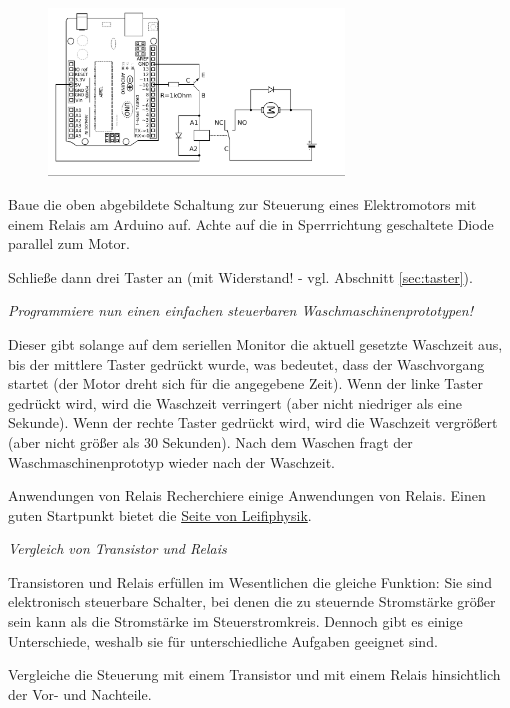 \begin{projekt}[Waschmaschinensteuerung]\label{proj:waschmaschinensteuerung}
	\begin{figure}[H]
		\centering
		\includegraphics[width=0.7\textwidth]{./Zeichnungen/relais-schaltung-mit-motor.png}
	\end{figure}
	Baue die oben abgebildete Schaltung zur Steuerung eines Elektromotors mit einem Relais am Arduino auf. Achte auf die in Sperrrichtung geschaltete Diode parallel zum Motor.
	
	Schließe dann drei Taster an (mit Widerstand! - vgl. Abschnitt \ref{sec:taster}).
	
	\emph{Programmiere nun einen einfachen steuerbaren Waschmaschinenprototypen!}
	
	Dieser gibt solange auf dem seriellen Monitor die aktuell gesetzte Waschzeit aus, bis der mittlere Taster gedrückt wurde, was bedeutet, dass der Waschvorgang startet (der Motor dreht sich für die angegebene Zeit). Wenn der linke Taster gedrückt wird, wird die Waschzeit verringert (aber nicht niedriger als eine Sekunde). Wenn der rechte Taster gedrückt wird, wird die Waschzeit vergrößert (aber nicht größer als 30 Sekunden). Nach dem Waschen fragt der Waschmaschinenprototyp wieder nach der Waschzeit.
\end{projekt}

\begin{recherche}{Anwendungen von Relais}
	Recherchiere einige Anwendungen von Relais. Einen guten Startpunkt bietet die \href{https://www.leifiphysik.de/elektrizitaetslehre/elektromagnetismus/ausblick/relais}{Seite von Leifiphysik}.
\end{recherche}

\begin{aufgabe} \emph{Vergleich von Transistor und Relais}
	
	Transistoren und Relais erfüllen im Wesentlichen die gleiche Funktion: Sie sind elektronisch steuerbare Schalter, bei denen die zu steuernde Stromstärke größer sein kann als die Stromstärke im Steuerstromkreis. Dennoch gibt es einige Unterschiede, weshalb sie für unterschiedliche Aufgaben geeignet sind.
	
	Vergleiche die Steuerung mit einem Transistor und mit einem Relais hinsichtlich der Vor- und Nachteile.
\end{aufgabe}


